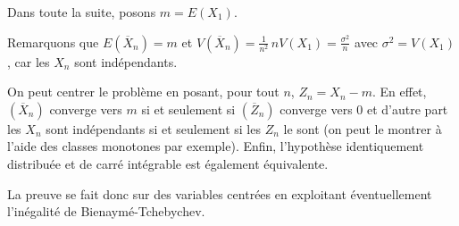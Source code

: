 Dans toute la suite, posons $m = E(X_1)$.

\begin{listremarques}
\item
Remarquons que $E\left (\overline{X}_n\right ) = m$ et $V \left ( \overline{X}_n \right ) = \frac{1}{n^2} \, n V(X_1) = \frac{\sigma^2}{n}$ avec $\sigma^2 = V(X_1)$, car les $X_n$ sont indépendants.
\item
On peut centrer le problème en posant, pour tout $n$, $Z_n = X_n - m$. En effet, $\left (\overline{X}_n\right )$ converge vers $m$ si et seulement si  $\left (\overline{Z}_n\right )$ converge vers $0$ et d'autre part les $X_n$ sont indépendants si et seulement si les $Z_n$ le sont (on peut le montrer à l'aide des classes monotones par exemple). Enfin, 
l'hypothèse \og identiquement distribuée et de carré intégrable \fg{} est également équivalente.


\end{listremarques}

La preuve se fait donc sur des variables centrées en exploitant éventuellement l'inégalité de Bienaymé-Tchebychev.


